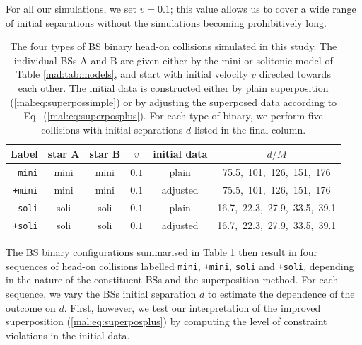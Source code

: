 For all our simulations, we
set $v=0.1$; this value
allows us to cover a wide range of initial separations 
without the simulations becoming prohibitively long.
%
\begin{table}[t]
    \centering
    \caption{The four types of BS binary head-on collisions simulated
    in this study. The individual BSs A and B are given either
    by the mini or solitonic model of Table \ref{mal:tab:models},
    and start with initial
    velocity $v$ directed towards each other. The initial data
    is constructed either by plain superposition
    (\ref{mal:eq:superpossimple}) or by adjusting
    the superposed data according to Eq.~(\ref{mal:eq:superposplus}).
    For each type of binary, we perform five collisions with
    initial separations $d$ listed in the final column.
    }
    \begin{tabular}{r|ccccc}
    \hline
    Label & star A & star B & $v$ & initial data & $d/M$ \\
    \hline
    {\tt mini} & mini & mini & $0.1$ & plain &
    75.5,~101,~126,~151,~176 \\
    {\tt +mini}& mini & mini & $0.1$ & adjusted &
    75.5,~101,~126,~151,~176 \\
    {\tt soli} & soli & soli & $0.1$ & plain &
    16.7,~22.3,~27.9,~33.5,~39.1 \\
    {\tt +soli} & soli & soli & $0.1$ &
    adjusted &
    16.7,~22.3,~27.9,~33.5,~39.1 \\
    \hline
    \end{tabular}
    \label{mal:tab:hods}
\end{table}
%
The BS binary configurations
summarised in Table \ref{mal:tab:hods} then result
in four sequences of head-on collisions labelled
{\tt mini}, {\tt +mini}, {\tt soli} and {\tt +soli},
depending in the nature of the constituent BSs and
the superposition method. For each sequence, we vary the
BSs initial separation $d$ to estimate the dependence of the
outcome on $d$. First, however, we test our interpretation
of the improved superposition (\ref{mal:eq:superposplus})
by computing the level of constraint violations in the
initial data.
